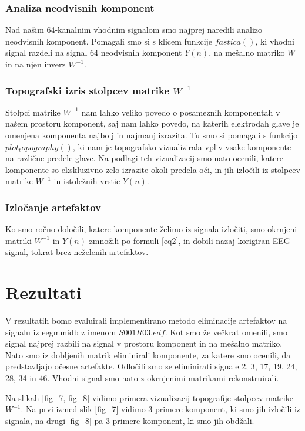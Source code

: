 \documentclass[9pt]{IEEEtran}
\begin{document}
\subsubsection{Analiza neodvisnih komponent}

Nad našim 64-kanalnim vhodnim signalom smo najprej naredili analizo neodvisnih komponent. Pomagali smo si s klicem funkcije $fastica()$, ki vhodni signal razdeli na signal 64 neodvisnih komponent $Y(n)$, na mešalno matriko  $W$ in na njen inverz $W^{-1}$.

\subsubsection{Topografski izris stolpcev matrike $W^{-1}$}

Stolpci matrike $W^{-1}$ nam lahko veliko povedo o posameznih komponentah v našem prostoru komponent, saj nam lahko povedo, na katerih elektrodah glave je omenjena komponenta najbolj in najmanj izrazita. Tu smo si pomagali s funkcijo $plot_topography()$, ki nam je topografsko vizualizirala vpliv vsake komponente na različne predele glave. Na podlagi teh vizualizacij smo nato ocenili, katere komponente so ekskluzivno zelo izrazite okoli predela oči, in jih izločili iz stolpcev matrike  $W^{-1}$ in istoležnih vrstic $Y(n)$.

\subsubsection{Izločanje artefaktov}

Ko smo ročno določili, katere komponente želimo iz signala izločiti, smo okrnjeni matriki $W^{-1}$ in $Y(n)$ zmnožili po formuli \ref{eq2}, in dobili nazaj korigiran EEG signal, tokrat brez neželenih artefaktov. 

\section{Rezultati}

V rezultatih bomo evaluirali implementirano metodo eliminacije artefaktov na signalu iz eegmmidb z imenom $S001R03.edf$. Kot smo že večkrat omenili, smo signal najprej razbili na signal v prostoru komponent in na mešalno matriko. Nato smo iz dobljenih matrik eliminirali komponente, za katere smo ocenili, da predstavljajo očesne artefakte. Odločili smo se eliminirati signale 2, 3, 17, 19, 24, 28, 34 in 46. Vhodni signal smo nato z okrnjenimi matrikami rekonstruirali.

Na slikah \ref{fig_7, fig_8} vidimo primera vizualizacij topografije stolpcev matrike $W^{-1}$. Na  prvi izmed slik \ref{fig_7} vidimo 3 primere komponent, ki smo jih izločili iz signala, na drugi  \ref{fig_8} pa 3 primere komponent, ki smo jih obdžali.
\end{document}
